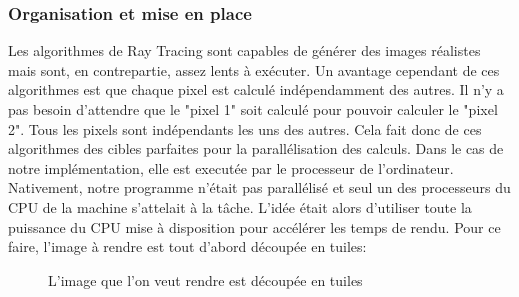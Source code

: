 \documentclass[11pt]{article}
\begin{document}
\subsubsection{Organisation et mise en place}

Les algorithmes de Ray Tracing sont capables de générer des images réalistes mais sont, en contrepartie, assez lents à exécuter. Un avantage cependant de ces algorithmes est que chaque pixel est calculé indépendamment des autres. Il n'y a pas besoin d'attendre que le "pixel 1" soit calculé pour pouvoir calculer le "pixel 2". Tous les pixels sont indépendants les uns des autres. Cela fait donc de ces algorithmes des cibles parfaites pour la parallélisation des calculs. Dans le cas de notre implémentation, elle est executée par le processeur de l'ordinateur. Nativement, notre programme n'était pas parallélisé et seul un des processeurs du CPU de la machine s'attelait à la tâche. L'idée était alors d'utiliser toute la puissance du CPU mise à disposition pour accélérer les temps de rendu. Pour ce faire, l'image à rendre est tout d'abord découpée en tuiles:

\begin{figure}[h!]

	\caption{L'image que l'on veut rendre est découpée en tuiles}
	\label{grilleMultithreading}
\end{figure}
\FloatBarrier
\end{document}
